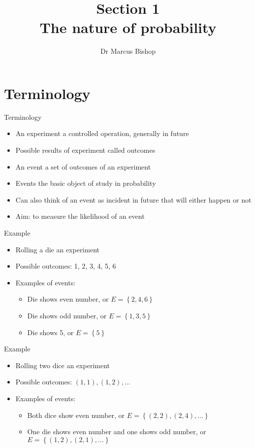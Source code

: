 \documentclass[handout]{beamer}
\title[\S1]{Section 1\\The nature of probability}
\author{Dr Marcus Bishop}
\theoremstyle{definition}
\begin{document}
\begin{frame}\titlepage\end{frame}
\LogoOff

\section{Terminology}
\begin{frame}{Terminology}
\begin{itemize}
\item An \alert{experiment} a controlled operation,
generally in future
\item Possible results of experiment called \alert{outcomes}
\item An \alert{event} a set of outcomes of an experiment
\item Events the basic object of study in probability
\item Can also think of an event as incident in future
that will either happen or not
\item Aim: to measure the likelihood of an event
\end{itemize}
\end{frame}

\begin{frame}{Example}
\begin{itemize}
\item Rolling a die an experiment
\item Possible outcomes: 1, 2, 3, 4, 5, 6
\item Examples of events:
\begin{itemize}
\item Die shows even number, or $E=\left\{2,4,6\right\}$
\item Die shows odd number, or $E=\left\{1,3,5\right\}$
\item Die shows 5, or $E=\left\{5\right\}$
\end{itemize}
\end{itemize}
\end{frame}

\begin{frame}{Example}
\begin{itemize}
\item Rolling \alert{two} dice an experiment
\item Possible outcomes: $\left(1,1\right),\left(1,2\right),\ldots$
\item Examples of events:
\begin{itemize}
\item Both dice show even number, or $E=\left\{\left(2,2\right),
\left(2,4\right),\ldots\right\}$
\item One die shows even number and one shows odd number,
or $E=\left\{\left(1,2\right),\left(2,1\right),\ldots\right\}$
\end{itemize}
\end{itemize}
\end{frame}
\end{document}
